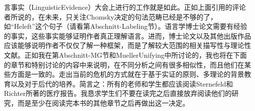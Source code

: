 言事实（LinguisticEvidence）大会上进行的工作就是如此。正如上面引用的评论者所说的，在未来，只关注Chomsky决定的句法范畴已经是不够的了，如“Heleft”这个句子（请看第Abschnitt-Labeling节）。语言学博士论文需要有经验的事实，这些事实能够证明作者真正理解语言。进而，博士论文以及其他出版作品应该能够说明作者不仅仅了解一种框架，而是了解较大范围的相关描写性与理论性文献。正如我在第Abschnitt-MG节和MuellerUnifying中所讨论的，我也将在下面的章节和特别讨论的内容中来说明，在不同分析之间有很多相似性，而且他们在某些方面是一致的。走出当前的危机的方式就在于基于实证的原则、多理论的背景教育以及对于后代的培养。简言之：所有的老师和学生都应该阅读Sternefeld和Richter所著的医疗报告。我恳求学生们不要在读完之后直接放弃阅读他们的研究，而是至少在阅读完本书的其他章节之后再做出这一决定。
